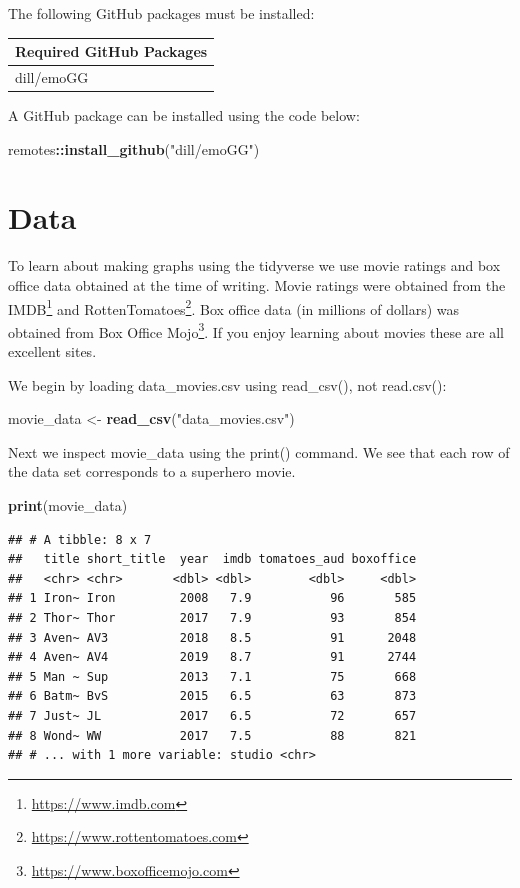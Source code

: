 \documentclass[
]{krantz}
\makeatletter
\newenvironment{Shaded}{\begin{snugshade}}{\end{snugshade}}
\newcommand{\KeywordTok}[1]{\textcolor[rgb]{0.27,0.27,0.27}{\textbf{#1}}}
\newcommand{\NormalTok}[1]{#1}
\newcommand{\OperatorTok}[1]{\textcolor[rgb]{0.43,0.43,0.43}{\textbf{#1}}}
\newcommand{\StringTok}[1]{\textcolor[rgb]{0.5,0.5,0.5}{#1}}
\renewcommand{\href}[2]{#2\footnote{\url{#1}}}
\newenvironment{kframe}{%
\medskip{}
\setlength{\fboxsep}{.8em}
 \def\at@end@of@kframe{}%
 \ifinner\ifhmode%
  \def\at@end@of@kframe{\end{minipage}}%
  \begin{minipage}{\columnwidth}%
 \fi\fi%
 \def\FrameCommand##1{\hskip\@totalleftmargin \hskip-\fboxsep
 \colorbox{shadecolor}{##1}\hskip-\fboxsep
     \hskip-\linewidth \hskip-\@totalleftmargin \hskip\columnwidth}%
 \MakeFramed {\advance\hsize-\width
   \@totalleftmargin\z@ \linewidth\hsize
   \@setminipage}}%
 {\par\unskip\endMakeFramed%
 \at@end@of@kframe}
\renewenvironment{Shaded}{\begin{kframe}}{\end{kframe}}
\makeatother
\begin{document}
The following GitHub packages must be installed:

\begin{longtable}[]{@{}l@{}}
\toprule
Required GitHub Packages\tabularnewline
\midrule
\endhead
dill/emoGG\tabularnewline
\bottomrule
\end{longtable}

A GitHub package can be installed using the code below:

\begin{Shaded}
\begin{Highlighting}[]
\NormalTok{remotes}\OperatorTok{::}\KeywordTok{install_github}\NormalTok{(}\StringTok{"dill/emoGG"}\NormalTok{)}
\end{Highlighting}
\end{Shaded}

\hypertarget{data}{%
\section{Data}\label{data}}

To learn about making graphs using the tidyverse we use movie ratings and box office data obtained at the time of writing. Movie ratings were obtained from the \href{https://www.imdb.com}{IMDB} and \href{https://www.rottentomatoes.com}{RottenTomatoes}. Box office data (in millions of dollars) was obtained from \href{https://www.boxofficemojo.com}{Box Office Mojo}. If you enjoy learning about movies these are all excellent sites.

We begin by loading data\_movies.csv using read\_csv(), not read.csv():

\begin{Shaded}
\begin{Highlighting}[]
\NormalTok{movie_data <-}\StringTok{ }\KeywordTok{read_csv}\NormalTok{(}\StringTok{"data_movies.csv"}\NormalTok{)}
\end{Highlighting}
\end{Shaded}

Next we inspect movie\_data using the print() command. We see that each row of the data set corresponds to a superhero movie.

\begin{Shaded}
\begin{Highlighting}[]
\KeywordTok{print}\NormalTok{(movie_data)}
\end{Highlighting}
\end{Shaded}

\begin{verbatim}
## # A tibble: 8 x 7
##   title short_title  year  imdb tomatoes_aud boxoffice
##   <chr> <chr>       <dbl> <dbl>        <dbl>     <dbl>
## 1 Iron~ Iron         2008   7.9           96       585
## 2 Thor~ Thor         2017   7.9           93       854
## 3 Aven~ AV3          2018   8.5           91      2048
## 4 Aven~ AV4          2019   8.7           91      2744
## 5 Man ~ Sup          2013   7.1           75       668
## 6 Batm~ BvS          2015   6.5           63       873
## 7 Just~ JL           2017   6.5           72       657
## 8 Wond~ WW           2017   7.5           88       821
## # ... with 1 more variable: studio <chr>
\end{verbatim}
\end{document}
